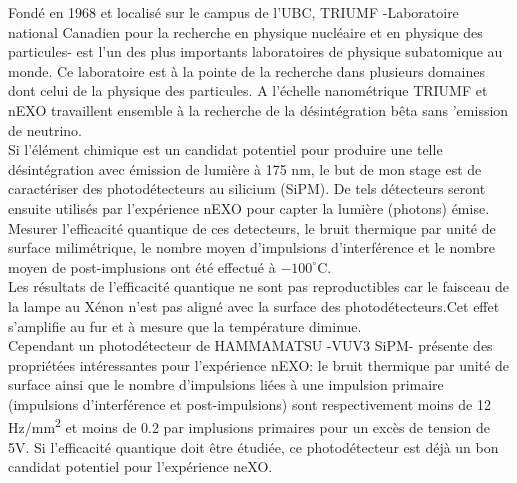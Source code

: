 \documentclass[a4paper, 11pt]{report}%
\newcommand{\TR}{TRIUMF }
\begin{document}
   Fond\'e en 1968 et localis\'e sur le campus de l'UBC, \TR -Laboratoire national Canadien pour la recherche en physique nucl\'eaire et en physique des 
   particules- est l'un des plus importants laboratoires de physique subatomique au monde. Ce laboratoire est \`a la pointe de la recherche
   dans plusieurs domaines dont celui de la physique des particules. 
   A l'\'echelle nanom\'etrique \TR et nEXO travaillent ensemble \`a la recherche de la d\'esint\'egration b\^eta sans 'emission
   de neutrino.\\ 
   Si l'\'el\'ement chimique  est un candidat potentiel pour produire une telle d\'esint\'egration avec \'emission de lumi\`ere \`a 175 nm, le but de mon 
   stage est de caract\'eriser des photod\'etecteurs au silicium (SiPM). De tels d\'etecteurs seront ensuite utilis\'es par l'exp\'erience nEXO 
   pour capter la lumi\`ere
   (photons) \'emise. Mesurer l'efficacit\'e quantique de ces detecteurs, le bruit thermique par unit\'e de surface milim\'etrique, 
   le nombre moyen
   d'impulsions d'interf\'erence et le nombre moyen de post-implusions ont \'et\'e effectu\'e à $-100^\circ$C.\\
   Les r\'esultats de l'efficacit\'e quantique ne sont pas reproductibles car le faisceau de la lampe au X\'enon n'est pas align\'e avec 
   la surface des photod\'etecteurs.Cet effet s'amplifie au fur et \`a mesure que la temp\'erature diminue.\\
   Cependant un photod\'etecteur de HAMMAMATSU -VUV3 SiPM- pr\'esente des propri\'et\'ees int\'eressantes pour l'exp\'erience nEXO: 
   le bruit thermique par unit\'e de surface ainsi que le nombre d'impulsions li\'ees \`a une impulsion primaire (impulsions d'interf\'erence et post-impulsions) 
   sont respectivement moins de 12 Hz/mm\textsuperscript{2} et moins de 0.2 par implusions primaires pour un exc\`es de tension de 5V. 
   Si l'efficacit\'e quantique doit \^etre 
   \'etudi\'ee, ce 
   photod\'etecteur est d\'ej\`a un bon candidat potentiel pour l'exp\'erience neXO.
   
     
   

\thispagestyle{empty}
\tableofcontents 



\end{document}
